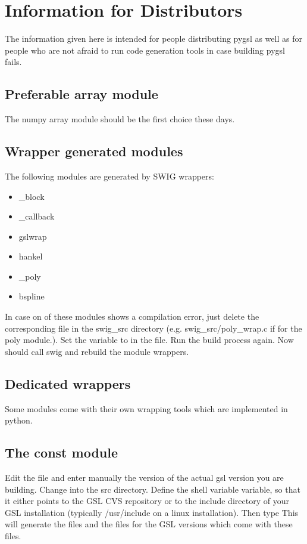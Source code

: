 \section{Information for Distributors}
  
The information given here is intended for people distributing pygsl as well
as for people who are not afraid to run code generation tools in case building pygsl
fails. 

\subsection{Preferable array module}
The numpy array module should be the first choice these days.

\subsection{Wrapper generated modules}
The following modules are generated by  SWIG wrappers:
\begin{itemize}
\item 
_block
\item 
_callback
\item 
gslwrap
\item 
hankel
\item 
_poly
\item
bspline
\end{itemize}

In case on of these modules shows a compilation error, just delete the
corresponding file in the swig_src directory (e.g. swig_src/poly_wrap.c if
for the poly module.). Set the variable  to  in the 
 file.
Run the build process again. Now  should call swig and rebuild the
module wrappers.

\subsection{Dedicated wrappers}
  
Some modules come with their own wrapping tools which are implemented in python.

\subsection{The const module}
Edit the file  and enter manually the version
of the actual gsl version you are building. 
Change into the src directory. Define the shell variable
 variable, so that it either points to the GSL CVS
  repository or to the include directory of your GSL installation (typically
  /usr/include on a linux installation).
  Then type 
  This will generate the files  
and the files 
for the GSL versions which come with these files.

